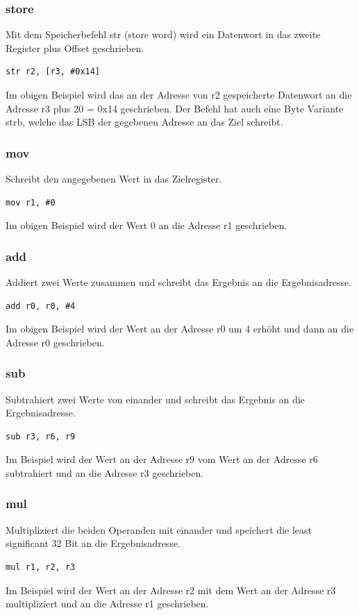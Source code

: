\documentclass[a4paper,12pt,leqno]{article}
\begin{document}
\subsubsection{store}
Mit dem Speicherbefehl str (store word) wird ein Datenwort in das zweite Register plus Offset geschrieben.
\begin{lstlisting}
str r2, [r3, #0x14]
\end{lstlisting}

Im obigen Beispiel wird das an der Adresse von r2 gespeicherte Datenwort an die Adresse r3 plus 20 = 0x14 geschrieben.
Der Befehl hat auch eine Byte Variante strb, welche das LSB der gegebenen Adresse an das Ziel schreibt.

\subsubsection{mov}
Schreibt den angegebenen Wert in das Zielregister.
\begin{lstlisting}
mov r1, #0
\end{lstlisting}
Im obigen Beispiel wird der Wert 0 an die Adresse r1 geschrieben.

\subsubsection{add}
Addiert zwei Werte zusammen und schreibt das Ergebnis an die Ergebnisadresse.
\begin{lstlisting}
add r0, r0, #4
\end{lstlisting}
Im obigen Beispiel wird der Wert an der Adresse r0 um 4 erhöht und dann an die Adresse r0 geschrieben. 

\subsubsection{sub}
Subtrahiert zwei Werte von einander und schreibt das Ergebnis an die Ergebnisadresse.

\begin{lstlisting}
sub r3, r6, r9
\end{lstlisting}
Im Beispiel wird der Wert an der Adresse r9 vom Wert an der Adresse r6 subtrahiert und an die Adresse r3 geschrieben. 

\subsubsection{mul}

Multipliziert die beiden Operanden mit einander und speichert die least significant 32 Bit an die Ergebnisadresse.
\begin{lstlisting}
mul r1, r2, r3
\end{lstlisting}
Im Beispiel wird der Wert an der Adresse r2 mit dem Wert an der Adresse r3 multipliziert und an die Adresse r1 geschrieben.
\end{document}
